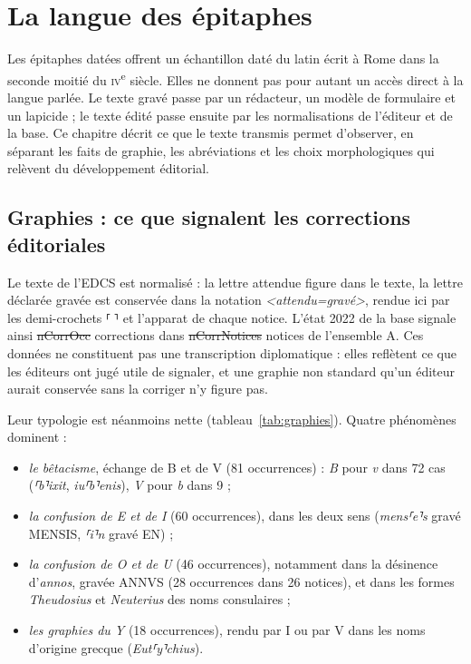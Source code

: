 \chapter{La langue des épitaphes}\label{ch:langue}

Les épitaphes datées offrent un échantillon daté du latin écrit à Rome dans la seconde moitié du \textsc{iv}\textsuperscript{e} siècle. Elles ne donnent pas pour autant un accès direct à la langue parlée. Le texte gravé passe par un rédacteur, un modèle de formulaire et un lapicide ; le texte édité passe ensuite par les normalisations de l’éditeur et de la base. Ce chapitre décrit ce que le texte transmis permet d’observer, en séparant les faits de graphie, les abréviations et les choix morphologiques qui relèvent du développement éditorial.

\section{Graphies : ce que signalent les corrections éditoriales}

Le texte de l’EDCS est normalisé : la lettre attendue figure dans le texte, la lettre déclarée gravée est conservée dans la notation \emph{<attendu=gravé>}, rendue ici par les demi-crochets ⸢ ⸣ et l’apparat de chaque notice. L’état 2022 de la base signale ainsi \st{nCorrOcc} corrections dans \st{nCorrNotices} notices de l’ensemble A. Ces données ne constituent pas une transcription diplomatique : elles reflètent ce que les éditeurs ont jugé utile de signaler, et une graphie non standard qu’un éditeur aurait conservée sans la corriger n’y figure pas.

Leur typologie est néanmoins nette (tableau~\ref{tab:graphies}). Quatre phénomènes dominent :

\begin{itemize}
\item \emph{le bêtacisme}, échange de B et de V (81 occurrences) : \emph{B} pour \emph{v} dans 72 cas (\emph{⸢b⸣ixit}, \emph{iu⸢b⸣enis}), \emph{V} pour \emph{b} dans 9 ;
\item \emph{la confusion de E et de I} (60 occurrences), dans les deux sens (\emph{mens⸢e⸣s} gravé MENSIS, \emph{⸢i⸣n} gravé EN) ;
\item \emph{la confusion de O et de U} (46 occurrences), notamment dans la désinence d’\emph{annos}, gravée ANNVS (28 occurrences dans 26 notices), et dans les formes \emph{Theudosius} et \emph{Neuterius} des noms consulaires ;
\item \emph{les graphies du Y} (18 occurrences), rendu par I ou par V dans les noms d’origine grecque (\emph{Eut⸢y⸣chius}).
\end{itemize}

